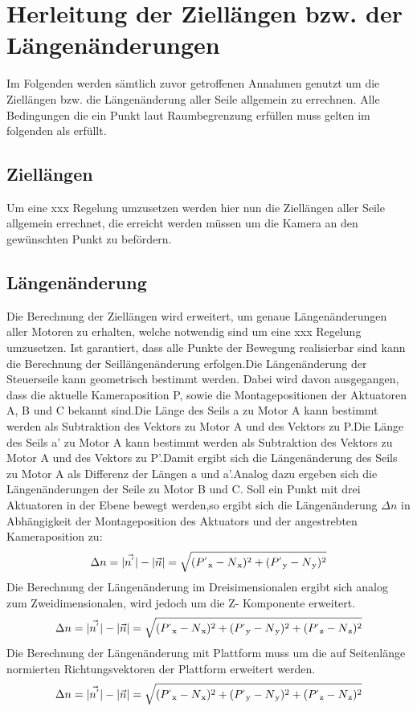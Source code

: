 \section{Herleitung der Ziellängen bzw. der Längenänderungen}
	Im Folgenden werden sämtlich zuvor getroffenen Annahmen genutzt um die Ziellängen bzw. die Längenänderung aller Seile allgemein zu errechnen. Alle Bedingungen die ein Punkt laut Raumbegrenzung erfüllen muss gelten im folgenden als erfüllt.
		\subsection{Ziellängen}
		Um eine xxx Regelung umzusetzen werden hier nun die Ziellängen aller Seile allgemein errechnet, die erreicht werden müssen um die Kamera an den gewünschten Punkt zu befördern.
		\subsection{Längenänderung}
			Die Berechnung der Ziellängen wird erweitert, um genaue Längenänderungen aller Motoren zu erhalten, welche notwendig sind um eine xxx Regelung umzusetzen.
			Ist garantiert, dass alle Punkte der Bewegung realisierbar sind kann die Berechnung der Seillängenänderung erfolgen.Die Längenänderung der Steuerseile kann geometrisch bestimmt werden.
			Dabei wird davon ausgegangen, dass die aktuelle Kameraposition P, sowie die Montagepositionen der Aktuatoren A, B und C bekannt sind.Die Länge des Seils a zu Motor A kann bestimmt werden als Subtraktion des Vektors zu Motor A und des Vektors zu P.Die Länge des Seils a' zu Motor A kann bestimmt werden als Subtraktion des Vektors zu Motor A und des Vektors zu P'.Damit ergibt sich die Längenänderung des Seils zu Motor A als Differenz der Längen a und a'.Analog dazu ergeben sich die Längenänderungen der Seile zu Motor B und C.
			Soll ein Punkt mit drei Aktuatoren in der Ebene bewegt werden,so ergibt sich die Längenänderung $\Delta n$ in Abhängigkeit der Montageposition des Aktuators und der angestrebten Kameraposition zu:
			\begin{align}
				\Delta n =
				|\vec{n^{'}}|-|\vec{n}|=
				\sqrt	{
						(P^{'}\textsubscript{x}-N\textsubscript{x})^2+
						(P^{'}\textsubscript{y}-N\textsubscript{y})^2
						}
			\end{align}
			Die Berechnung der Längenänderung im Dreisimensionalen ergibt sich analog zum Zweidimensionalen, wird jedoch um die Z- Komponente erweitert.
			\begin{align}
				\Delta n =
				|\vec{n^{'}}|-|\vec{n}|=
				\sqrt	{
						(P^{`}\textsubscript{x}-N\textsubscript{x})^2+
						(P^{`}\textsubscript{y}-N\textsubscript{y})^2+
						(P^{`}\textsubscript{z}-N\textsubscript{z})^2
						}
			\end{align}	
			Die Berechnung der Längenänderung mit Plattform muss um die auf Seitenlänge normierten Richtungsvektoren der Plattform erweitert werden.
			\begin{align}
				\Delta n =
				|\vec{n^{'}}|-|\vec{n}|=
				\sqrt	{
						(P^{`}\textsubscript{x}-N\textsubscript{x})^2+
						(P^{`}\textsubscript{y}-N\textsubscript{y})^2+
						(P^{`}\textsubscript{z}-N\textsubscript{z})^2
						}
			\end{align}
	\pagebreak